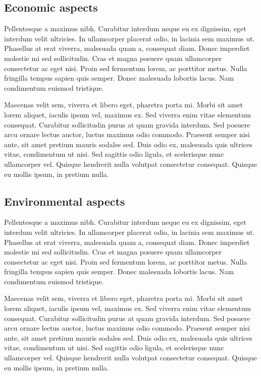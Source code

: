 \subsection{Economic aspects}

Pellentesque a maximus nibh. Curabitur interdum neque eu ex dignissim, eget interdum velit ultricies. In ullamcorper placerat odio, in lacinia sem maximus ut. Phasellus at erat viverra, malesuada quam a, consequat diam. Donec imperdiet molestie mi sed sollicitudin. Cras et magna posuere quam ullamcorper consectetur ac eget nisi. Proin sed fermentum lorem, ac porttitor metus. Nulla fringilla tempus sapien quis semper. Donec malesuada lobortis lacus. Nam condimentum euismod tristique.

Maecenas velit sem, viverra et libero eget, pharetra porta mi. Morbi sit amet lorem aliquet, iaculis ipsum vel, maximus ex. Sed viverra enim vitae elementum consequat. Curabitur sollicitudin purus at quam gravida interdum. Sed posuere arcu ornare lectus auctor, luctus maximus odio commodo. Praesent semper nisi ante, sit amet pretium mauris sodales sed. Duis odio ex, malesuada quis ultrices vitae, condimentum ut nisi. Sed sagittis odio ligula, et scelerisque nunc ullamcorper vel. Quisque hendrerit nulla volutpat consectetur consequat. Quisque eu mollis ipsum, in pretium nulla.

\subsection{Environmental aspects}

Pellentesque a maximus nibh. Curabitur interdum neque eu ex dignissim, eget interdum velit ultricies. In ullamcorper placerat odio, in lacinia sem maximus ut. Phasellus at erat viverra, malesuada quam a, consequat diam. Donec imperdiet molestie mi sed sollicitudin. Cras et magna posuere quam ullamcorper consectetur ac eget nisi. Proin sed fermentum lorem, ac porttitor metus. Nulla fringilla tempus sapien quis semper. Donec malesuada lobortis lacus. Nam condimentum euismod tristique.

Maecenas velit sem, viverra et libero eget, pharetra porta mi. Morbi sit amet lorem aliquet, iaculis ipsum vel, maximus ex. Sed viverra enim vitae elementum consequat. Curabitur sollicitudin purus at quam gravida interdum. Sed posuere arcu ornare lectus auctor, luctus maximus odio commodo. Praesent semper nisi ante, sit amet pretium mauris sodales sed. Duis odio ex, malesuada quis ultrices vitae, condimentum ut nisi. Sed sagittis odio ligula, et scelerisque nunc ullamcorper vel. Quisque hendrerit nulla volutpat consectetur consequat. Quisque eu mollis ipsum, in pretium nulla.

